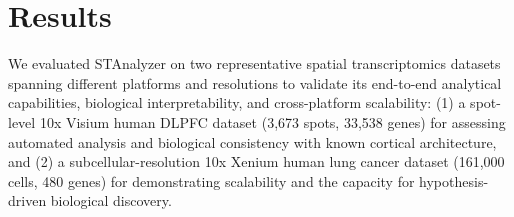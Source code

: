 \documentclass[a4,center,fleqn]{NAR}
\begin{document}


\section{Results}

We evaluated STAnalyzer on two representative spatial transcriptomics datasets spanning different platforms and resolutions to validate its end-to-end analytical capabilities, biological interpretability, and cross-platform scalability: (1) a spot-level 10x Visium human DLPFC dataset (3,673 spots, 33,538 genes) for assessing automated analysis and biological consistency with known cortical architecture, and (2) a subcellular-resolution 10x Xenium human lung cancer dataset (161,000 cells, 480 genes) for demonstrating scalability and the capacity for hypothesis-driven biological discovery.



\end{document}
